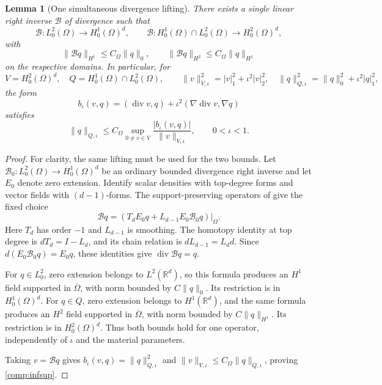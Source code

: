 \documentclass[11pt,a4paper]{article}
\newtheorem{lemma}[theorem]{Lemma}
\theoremstyle{remark}
\numberwithin{equation}{section}
\begin{document}
\begin{lemma}[One simultaneous divergence lifting]\label{comp:bogovskii}
There exists a single linear right inverse $\mathcal B$ of divergence such
that
\[
 \mathcal B:L^2_0(\Omega)\longrightarrow H^1_0(\Omega)^d,
 \qquad
 \mathcal B:H^1_0(\Omega)\cap L^2_0(\Omega)
          \longrightarrow H^2_0(\Omega)^d,
\]
with
\[
 \|\mathcal Bq\|_{H^1}\le C_\Omega\|q\|_0,
 \qquad
 \|\mathcal Bq\|_{H^2}\le C_\Omega\|q\|_{H^1}
\]
on the respective domains. In particular, for
\[
 V=H^2_0(\Omega)^d,\quad Q=H^1_0(\Omega)\cap L^2_0(\Omega),\qquad
 \|v\|_{V,\iota}^2=|v|_1^2+\iota^2|v|_2^2,
 \quad \|q\|_{Q,\iota}^2=\|q\|_0^2+\iota^2|q|_1^2,
\]
the form
\[
 b_\iota(v,q)=(\operatorname{div}v,q)
       +\iota^2(\nabla\operatorname{div}v,\nabla q)
\]
satisfies
\begin{equation}\label{comp:infsup}
 \|q\|_{Q,\iota}
 \le C_\Omega\sup_{0\ne v\in V}
          \frac{|b_\iota(v,q)|}{\|v\|_{V,\iota}},
 \qquad 0<\iota<1.
\end{equation}
\end{lemma}
\begin{proof}
For clarity, the same lifting must be used for the two bounds. Let
$\mathcal B_0:L^2_0(\Omega)\to H^1_0(\Omega)^d$ be an ordinary bounded
divergence right inverse and let $E_0$ denote zero extension. Identify scalar
densities with top-degree forms and vector fields with $(d-1)$-forms. The
support-preserving operators of
\cite[Theorem 4.6 and the proof of Corollary 4.7(b)]{CostabelMcIntosh2010}
give the fixed choice
\[
 \mathcal Bq
 =\left(T_dE_0q+L_{d-1}E_0\mathcal B_0q\right)\big|_\Omega.
\]
Here $T_d$ has order $-1$ and $L_{d-1}$ is smoothing. The homotopy identity
at top degree is $dT_d=I-L_d$, and its chain relation is
$dL_{d-1}=L_dd$. Since $d(E_0\mathcal B_0q)=E_0q$, these identities give
$\operatorname{div}\mathcal Bq=q$.

For $q\in L^2_0$, zero extension belongs to $L^2(\mathbb R^d)$, so this
formula produces an $H^1$ field supported in $\overline\Omega$, with norm
bounded by $C\|q\|_0$. Its restriction is in $H^1_0(\Omega)^d$.
For $q\in Q$, zero extension belongs to $H^1(\mathbb R^d)$, and the same
formula produces an $H^2$ field supported in $\overline\Omega$, with norm
bounded by $C\|q\|_{H^1}$. Its restriction is in $H^2_0(\Omega)^d$.
Thus both bounds hold for one operator, independently of $\iota$ and the
material parameters.

Taking $v=\mathcal Bq$ gives
$b_\iota(v,q)=\|q\|_{Q,\iota}^2$ and
$\|v\|_{V,\iota}\le C_\Omega\|q\|_{Q,\iota}$, proving
\eqref{comp:infsup}.
\end{proof}
\end{document}

